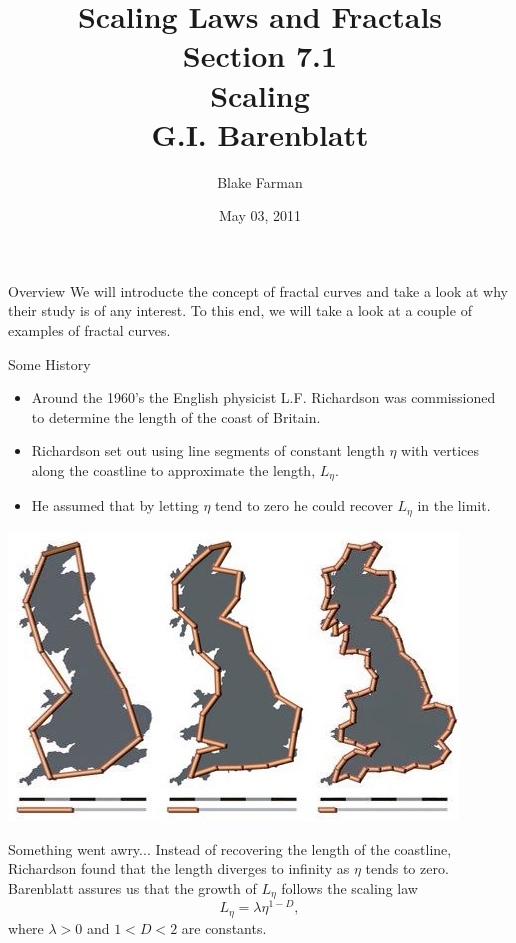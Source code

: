 \documentclass[10pt]{beamer}
\author{Blake Farman}
\title{Scaling Laws and Fractals\\
  Section 7.1\\
  Scaling\\
  G.I. Barenblatt\\
}
\institute{
  Department of Mathematics and Statistics\\
  University of Vermont\\
  Burlington, Vermont 05405\\[1ex]
  \texttt{bfarman@cems.uvm.edu}
}
\date{May 03, 2011}
\begin{document}
\theoremstyle{definition}
\newtheorem{defn}{Definition}[section]

\begin{frame}[plain]
  \titlepage
\end{frame}

\begin{frame}{Overview}
  We will introducte the concept of fractal curves and take a look at why their study is of any interest.
  To this end, we will take a look at a couple of examples of fractal curves.
\end{frame}

\begin{frame}{Some History}
  \begin{itemize}
    \item
      Around the 1960's the English physicist L.F. Richardson was commissioned to determine the length of the coast of Britain.
    \item
      Richardson set out using line segments of constant length $\eta$ with vertices along the coastline to approximate the length, $L_{\eta}$.
    \item
      He assumed that by letting $\eta$ tend to zero he could recover $L_{\eta}$ in the limit.
    \end{itemize}
    \begin{center}
      \includegraphics[scale=0.4]{./brit.jpg}\\
      \cite{Wiki}
    \end{center}
\end{frame}

\begin{frame}{Something went awry...}
  Instead of recovering the length of the coastline, Richardson found that the length diverges to infinity as $\eta$ tends to zero.
  Barenblatt assures us that the growth of $L_{\eta}$ follows the scaling law
  \begin{equation}
    \label{1}
    L_{\eta} = \lambda \eta^{1-D},
  \end{equation}
  where $\lambda > 0$ and $1 < D < 2$ are constants.  
\end{frame}
\end{document}
